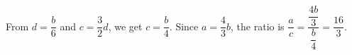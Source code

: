 From $d=\dfrac{b}{6}$ and $c=\dfrac{3}{2}d$, we get $c=\dfrac{b}{4}$. Since $a=\dfrac{4}{3}b$, the ratio is $\dfrac{a}{c}=\dfrac{\dfrac{4b}{3}}{\dfrac{b}{4}}=\boxed{\dfrac{16}{3}}$.
